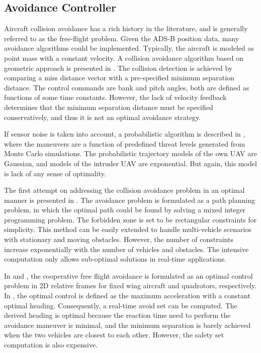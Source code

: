 \documentclass[journal,11pt,onecolumn,draftclsnofoot,]{IEEEtran}
\begin{document}
\subsection{Avoidance Controller}

Aircraft collision avoidance has a rich history in the literature, and is generally referred to as the free-flight problem. Given the ADS-B position data, many avoidance algorithms could be implemented. Typically, the aircraft is modeled as point mass with a constant velocity. A collision avoidance algorithm based on geometric approach is presented in \cite{park2008uav}. The collision detection is achieved by comparing a miss distance vector with a pre-specified minimum separation distance. The control commands are bank and pitch angles, both are defined as functions of some time constants. However, the lack of velocity feedback determines that the minimum separation distance must be specified conservatively, and thus it is not an optimal avoidance strategy.

If sensor noise is taken into account, a probabilistic algorithm is described in \cite{kim2007uav}, where the maneuvers are a function of predefined threat levels generated from Monte Carlo simulations. The probabilistic trajectory models of the own UAV are Gaussian, and models of the intruder UAV are exponential. But again, this model is lack of any sense of optimality.

The first attempt on addressing the collision avoidance problem in an optimal manner is presented in \cite{schouwenaars2001mixed, mellinger2012mixed}. The avoidance problem is formulated as a path planning problem, in which the optimal path could be found by solving a mixed integer programming problem. The forbidden zone is set to be rectangular constraints for simplicity. This method can be easily extended to handle multi-vehicle scenarios with stationary and moving obstacles. However, the number of constraints increase exponentially with the number of vehicles and obstacles. The intensive computation only allows sub-optimal solutions in real-time applications.

In \cite{krozel1996free} and \cite{hoffmann2008decentralized}, the cooperative free flight avoidance is formulated as an optimal control problem in 2D relative frames for fixed wing aircraft and quadrotors, respectively. In \cite{hoffmann2008decentralized}, the optimal control is defined as the maximum acceleration with a constant optimal heading. Consequently, a real-time avoid set can be computed. The derived heading is optimal because the reaction time need to perform the avoidance maneuver is minimal, and the minimum separation is barely achieved when the two vehicles are closest to each other. However, the safety set computation is also expensive. 
\end{document}
